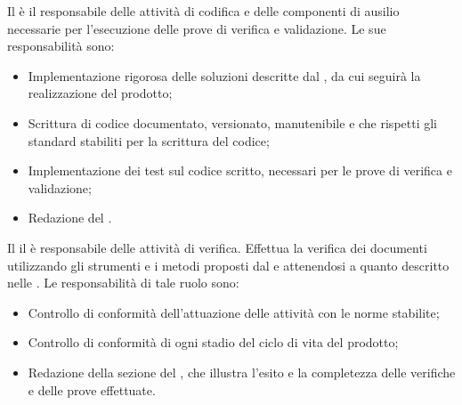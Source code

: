 \subsubsubsubsection{\rp}
Il \rp è il responsabile delle attività di codifica e delle componenti di ausilio necessarie per l'esecuzione delle prove di verifica e validazione. Le sue responsabilità sono:
\begin{itemize}
\item Implementazione rigorosa delle soluzioni descritte dal \rP, da cui seguirà la realizzazione del prodotto;
\item Scrittura di codice documentato, versionato, manutenibile e che rispetti gli standard stabiliti per la scrittura del codice;
\item Implementazione dei test sul codice scritto, necessari per le prove di verifica e validazione;
\item Redazione del \MU.
\end{itemize}
\subsubsubsubsection{\rV}
Il \rV il è responsabile delle attività di verifica. Effettua la verifica dei documenti utilizzando gli strumenti e i metodi proposti dal \PQ e attenendosi a quanto descritto nelle \NP. Le responsabilità di tale ruolo sono:
\begin{itemize}
\item Controllo di conformità dell'attuazione delle attività con le norme stabilite;
\item Controllo di conformità di ogni stadio del ciclo di vita del prodotto;
\item Redazione della sezione del \PQ, che illustra l'esito e la completezza delle verifiche e delle prove effettuate.
\end{itemize}
